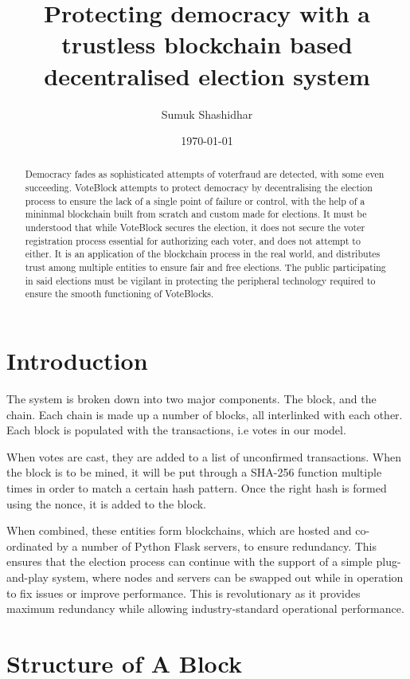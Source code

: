 \documentclass{article}
\title{Protecting democracy with a trustless blockchain based decentralised election system}
\author{Sumuk Shashidhar}
\affil{\small sumuks2@illinois.edu}
\date{\today}
\begin{document}
	\maketitle
	\begin{abstract}
		Democracy fades as sophisticated attempts of voterfraud are detected, with some even succeeding. VoteBlock attempts to protect democracy by decentralising the election process to ensure the lack of a single point of failure or control, with the help of a mininmal blockchain built from scratch and custom made for elections. It must be understood that while VoteBlock secures the election, it does not secure the voter registration process essential for authorizing each voter, and does not attempt to either. It is an application of the blockchain process in the real world, and distributes trust among multiple entities to ensure fair and free elections. The public participating in said elections must be vigilant in protecting the peripheral technology required to ensure the smooth functioning of VoteBlocks.
	\end{abstract}
	\pagebreak
	\tableofcontents
	\pagebreak
	\section{Introduction}
	The system is broken down into two major components. The block, and the chain. Each chain is made up a number of blocks, all interlinked with each other. Each block is populated with the transactions, i.e votes in our model.
	
	When votes are cast, they are added to a list of unconfirmed transactions. When the block is to be mined, it will be put through a SHA-256 function multiple times in order to match a certain hash pattern. Once the right hash is formed using the nonce, it is added to the block. 
	
	When combined, these entities form blockchains, which are hosted and co-ordinated by a number of Python Flask servers, to ensure redundancy. This ensures that the election process can continue with the support of a simple plug-and-play system, where nodes and servers can be swapped out while in operation to fix issues or improve performance. This is revolutionary as it provides maximum redundancy while allowing industry-standard operational performance. 
	\section{Structure of A Block}
\end{document}
